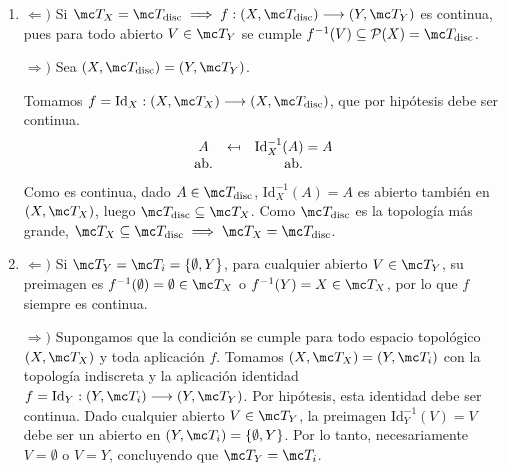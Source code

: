 \begin{dem}\begin{enumerate}
    \item $\Leftarrow)$ Si $\mc T_X = \mc T_{\text{disc}} \implies f: (X, \mc T_{\text{disc}}) \longrightarrow (Y, \mc T_Y)$ es continua, pues para todo abierto $V \in \mc T_Y$ se cumple $f^{-1}(V) \subseteq \mathcal{P}(X) = \mc T_{\text{disc}}$.
        
    $\Rightarrow)$ Sea $(X, \mc T_{\text{disc}}) = (Y, \mc T_Y)$.
        
        Tomamos $f = \text{Id}_X: (X, \mc T_X) \longrightarrow (X, \mc T_{\text{disc}})$, que por hipótesis debe ser continua.
        \[
            \begin{array}{ccc}
            A & \reflectbox{$\mapsto$} & \text{Id}_X^{-1}(A) = A \\
            \text{ab.} & & \text{ab.}
            \end{array}
        \]
        Como es continua, dado $A \in \mc T_{\text{disc}}$, $\text{Id}_X^{-1}(A) = A$ es abierto también en $(X, \mc T_X)$, luego $\mc T_{\text{disc}} \subseteq \mc T_X$. Como $\mc T_{\text{disc}}$ es la topología más grande, $\mc T_X \subseteq \mc T_{\text{disc}} \implies \mc T_X = \mc T_{\text{disc}}$.
    \item $\Leftarrow)$ Si $\mc T_Y = \mc T_i = \{\emptyset, Y\}$, para cualquier abierto $V \in \mc T_Y$, su preimagen es $f^{-1}(\emptyset) = \emptyset \in \mc T_X$ o $f^{-1}(Y) = X \in \mc T_X$, por lo que $f$ siempre es continua.

        $\Rightarrow)$  Supongamos que la condición se cumple para todo espacio topológico $(X, \mc T_X)$ y toda aplicación $f$. Tomamos $(X, \mc T_X) = (Y, \mc T_i)$ con la topología indiscreta y la aplicación identidad $f = \text{Id}_Y: (Y, \mc T_i) \longrightarrow (Y, \mc T_Y)$. Por hipótesis, esta identidad debe ser continua. Dado cualquier abierto $V \in \mc T_Y$, la preimagen $\text{Id}_Y^{-1}(V) = V$ debe ser un abierto en $(Y, \mc T_i) = \{\emptyset, Y\}$. Por lo tanto, necesariamente $V = \emptyset$ o $V = Y$, concluyendo que $\mc T_Y = \mc T_i$.
\end{enumerate}
\end{dem}


